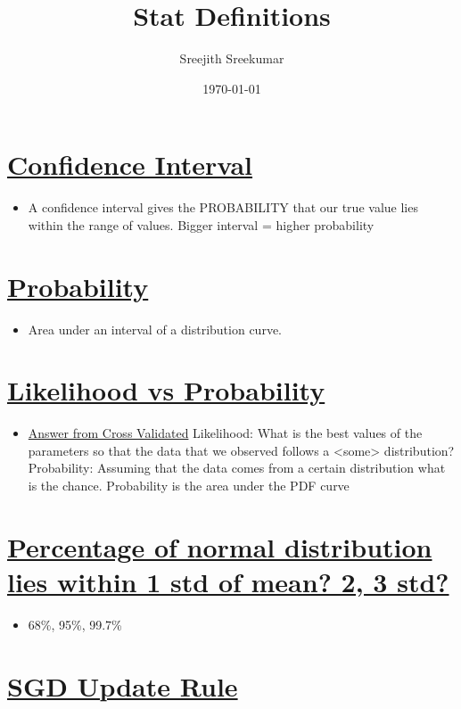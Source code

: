 \documentclass[11pt]{article}
\author{Sreejith Sreekumar}
\date{\today}
\title{Stat Definitions}
\begin{document}
\maketitle
\tableofcontents




\section{\underline{Confidence Interval}}
\label{sec:org826ddbb}
\begin{itemize}
\item A confidence interval gives the PROBABILITY that our true value lies within the range of values. Bigger interval = higher probability
\end{itemize}

\section{\underline{Probability}}
\label{sec:org6249d94}
\begin{itemize}
\item Area under an interval of a distribution curve.
\end{itemize}

\section{\underline{Likelihood vs Probability}}
\label{sec:org9d65e21}

\begin{itemize}
\item \href{https://stats.stackexchange.com/a/183885/84189}{Answer from Cross Validated}
Likelihood: What is the best values of the parameters so that the data that we observed follows a <some> distribution?
Probability: Assuming that the data comes from a certain distribution what is the chance. Probability is the area under the PDF curve
\end{itemize}

\section{\underline{Percentage of normal distribution lies within 1 std of mean? 2, 3 std?}}
\label{sec:orgcecaebc}
\begin{itemize}
\item 68\%, 95\%, 99.7\%
\end{itemize}

\section{\underline{SGD Update Rule}}
\label{sec:org97ebe27}
\end{document}
